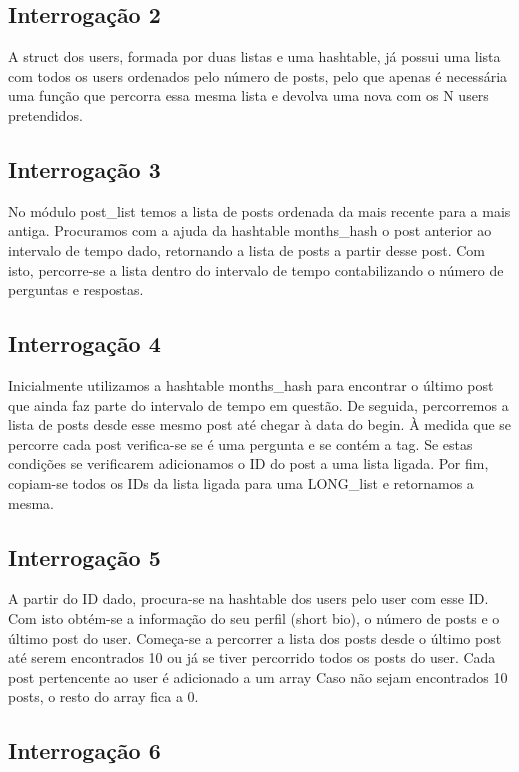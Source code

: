 \documentclass[10pt]{article}
\begin{document}
\subsection{Interrogação 2}

	A struct dos users, formada por duas listas e uma hashtable, já possui uma lista com todos os users ordenados pelo número de posts, pelo que apenas é necessária uma função que percorra essa mesma lista e devolva uma nova com os N users pretendidos.

\subsection{Interrogação 3}

	No módulo post\_list temos a lista de posts ordenada da mais recente para a mais antiga.
	Procuramos com a ajuda da hashtable months\_hash o post anterior ao intervalo de tempo dado, retornando a lista de posts a partir desse post. Com isto, percorre-se a lista dentro do intervalo de tempo contabilizando o número de perguntas e respostas.

\subsection{Interrogação 4}

	Inicialmente utilizamos a hashtable months\_hash para encontrar o último post que ainda faz parte do intervalo de tempo em questão. De seguida, percorremos a lista de posts desde esse mesmo post até chegar à data do begin. À medida que se percorre cada post verifica-se se é uma pergunta e se contém a tag. Se estas condições se verificarem adicionamos o ID do post a uma lista ligada. Por fim, copiam-se todos os IDs da lista ligada para uma LONG\_list e retornamos a mesma.

\subsection{Interrogação 5}

	A partir do ID dado, procura-se na hashtable dos users pelo user com esse ID. Com isto obtém-se a informação do seu perfil (short bio), o número de posts e o último post do user.
	Começa-se a percorrer a lista dos posts desde o último post até serem encontrados 10 ou já se tiver percorrido todos os posts do user.
	Cada post pertencente ao user é adicionado a um array
	Caso não sejam encontrados 10 posts, o resto do array fica a 0.

\subsection{Interrogação 6}
\end{document}
